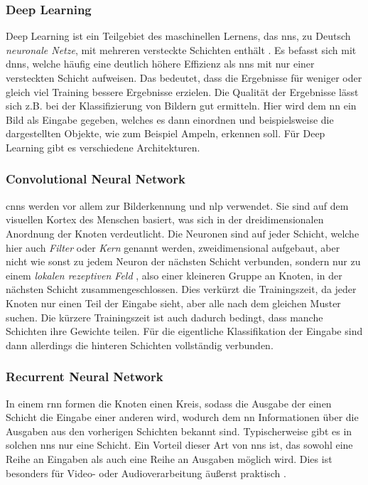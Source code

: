 \subsubsection{Deep Learning}

Deep Learning ist ein Teilgebiet des maschinellen Lernens, das \acp{nn}, zu Deutsch \emph{neuronale Netze}, mit mehreren versteckte Schichten enthält \citep{deeplearningreview}.
Es befasst sich mit \acp{dnn}, welche häufig eine deutlich höhere Effizienz als \acp{nn} mit nur einer versteckten Schicht aufweisen.
Das bedeutet, dass die Ergebnisse für weniger oder gleich viel Training bessere Ergebnisse erzielen.
Die Qualität der Ergebnisse lässt sich z.B. bei der Klassifizierung von Bildern gut ermitteln.
Hier wird dem \ac{nn} ein Bild als Eingabe gegeben, welches es dann einordnen und beispielsweise die dargestellten Objekte, wie zum Beispiel Ampeln, erkennen soll.
Für Deep Learning gibt es verschiedene Architekturen.

\subsubsection{Convolutional Neural Network}

\acp{cnn} werden vor allem zur Bilderkennung und \ac{nlp} verwendet.
Sie sind auf dem visuellen Kortex des Menschen basiert, was sich in der dreidimensionalen Anordnung der Knoten verdeutlicht.
Die Neuronen sind auf jeder Schicht, welche hier auch \emph{Filter} oder \emph{Kern} genannt werden,
zweidimensional aufgebaut, aber nicht wie sonst zu jedem Neuron der nächsten Schicht verbunden,
sondern nur zu einem \emph{lokalen rezeptiven Feld} \citep{deeplearningarchitecturesreview},
also einer kleineren Gruppe an Knoten, in der nächsten Schicht zusammengeschlossen.
Dies verkürzt die Trainingszeit, da jeder Knoten nur einen Teil der Eingabe sieht, aber alle nach dem gleichen Muster suchen.
Die kürzere Trainingszeit ist auch dadurch bedingt, dass manche Schichten ihre Gewichte teilen.
Für die eigentliche Klassifikation der Eingabe sind dann allerdings die hinteren Schichten vollständig verbunden.


\subsubsection{Recurrent Neural Network}

In einem \ac{rnn} formen die Knoten einen Kreis, sodass die Ausgabe der einen Schicht die Eingabe einer anderen wird,
wodurch dem \ac{nn} Informationen über die Ausgaben aus den vorherigen Schichten bekannt sind.
Typischerweise gibt es in solchen \acp{nn} nur eine Schicht.
Ein Vorteil dieser Art von \acp{nn} ist, das sowohl eine Reihe an Eingaben als auch eine Reihe an Ausgaben möglich wird.
Dies ist besonders für Video- oder Audioverarbeitung äußerst praktisch \citep{deeplearningarchitecturesreview}.

